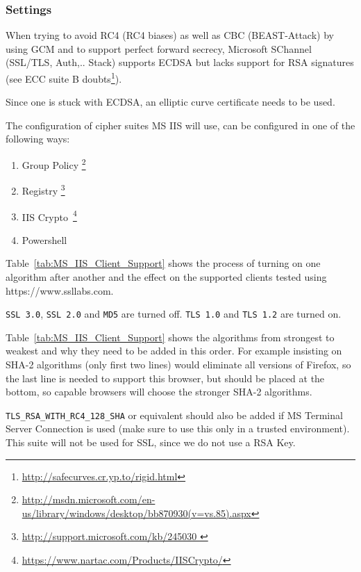 \subsubsection{Settings}
When trying to avoid RC4 (RC4 biases) as well as CBC (BEAST-Attack) by using GCM and to support perfect
forward secrecy, Microsoft SChannel (SSL/TLS, Auth,.. Stack) supports
ECDSA but lacks support for RSA signatures (see ECC suite
B doubts\footnote{\url{http://safecurves.cr.yp.to/rigid.html}}).

Since one is stuck with ECDSA, an elliptic curve certificate needs to be used.

The configuration of cipher suites MS IIS will use, can be configured in one
of the following ways:
\begin{enumerate}
  \item Group Policy \footnote{\url{http://msdn.microsoft.com/en-us/library/windows/desktop/bb870930(v=vs.85).aspx}}
  \item Registry  \footnote{\url{http://support.microsoft.com/kb/245030 }}
  \item IIS Crypto~\footnote{\url{https://www.nartac.com/Products/IISCrypto/}}
  \item Powershell
\end{enumerate}


Table~\ref{tab:MS_IIS_Client_Support} shows the process of turning on
one algorithm after another and the effect on the supported clients
tested using https://www.ssllabs.com.

\verb|SSL 3.0|, \verb|SSL 2.0| and \verb|MD5| are turned off.
\verb|TLS 1.0| and \verb|TLS 1.2| are turned on.


Table~\ref{tab:MS_IIS_Client_Support} shows the algorithms from
strongest to weakest and why they need to be added in this order. For
example insisting on SHA-2 algorithms (only first two lines) would
eliminate all versions of Firefox, so the last line is needed to
support this browser, but should be placed at the bottom, so capable
browsers will choose the stronger SHA-2 algorithms.

\verb|TLS_RSA_WITH_RC4_128_SHA| or equivalent should also be added if
MS Terminal Server Connection is used (make sure to use this only in a
trusted environment). This suite will not be used for SSL, since we do
not use a RSA Key.

